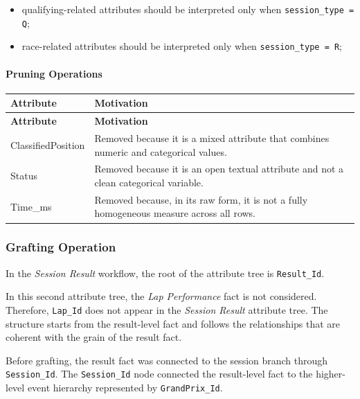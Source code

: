\documentclass[a4paper,11pt]{article}
\begin{document}
	\begin{itemize}
		\item qualifying-related attributes should be interpreted only when
		\texttt{session\_type = Q};
		
		\item race-related attributes should be interpreted only when
		\texttt{session\_type = R};

	\end{itemize}
	
	\paragraph*{Pruning Operations}
	
	\begin{longtable}{|p{4.4cm}|p{10.8cm}|}
		\hline
		\textbf{Attribute} & \textbf{Motivation} \\
		\hline
		\endfirsthead
		
		\hline
		\textbf{Attribute} & \textbf{Motivation} \\
		\hline
		\endhead
		
		ClassifiedPosition & Removed because it is a mixed attribute that combines numeric and categorical values. \\ \hline
		
		Status & Removed because it is an open textual attribute and not a clean categorical variable. \\ \hline
		
		Time\_ms & Removed because, in its raw form, it is not a fully homogeneous measure across all rows. \\ \hline
	\end{longtable}
	


	\subsubsection{Grafting Operation}
	
	In the \textit{Session Result} workflow, the root of the attribute tree is
	\texttt{Result\_Id}.
	
	In this second attribute tree, the \textit{Lap Performance} fact is not considered.
	Therefore, \texttt{Lap\_Id} does not appear in the \textit{Session Result} attribute tree.
	The structure starts from the result-level fact and follows the relationships that are
	coherent with the grain of the result fact.
	
	Before grafting, the result fact was connected to the session branch through
	\texttt{Session\_Id}. The \texttt{Session\_Id} node connected the result-level fact to the
	higher-level event hierarchy represented by \texttt{GrandPrix\_Id}.
	
\end{document}
